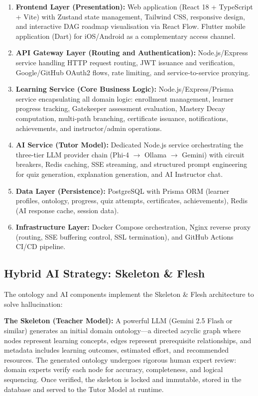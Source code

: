 \begin{enumerate}
    \item \textbf{Frontend Layer (Presentation):} Web application (React 18 + TypeScript + Vite) with Zustand state management, Tailwind CSS, responsive design, and interactive DAG roadmap visualisation via React Flow. Flutter mobile application (Dart) for iOS/Android as a complementary access channel.
    \item \textbf{API Gateway Layer (Routing and Authentication):} Node.js/Express service handling HTTP request routing, JWT issuance and verification, Google/GitHub OAuth2 flows, rate limiting, and service-to-service proxying.
    \item \textbf{Learning Service (Core Business Logic):} Node.js/Express/Prisma service encapsulating all domain logic: enrollment management, learner progress tracking, Gatekeeper assessment evaluation, Mastery Decay computation, multi-path branching, certificate issuance, notifications, achievements, and instructor/admin operations.
    \item \textbf{AI Service (Tutor Model):} Dedicated Node.js service orchestrating the three-tier LLM provider chain (Phi-4 $\to$ Ollama $\to$ Gemini) with circuit breakers, Redis caching, SSE streaming, and structured prompt engineering for quiz generation, explanation generation, and AI Instructor chat.
    \item \textbf{Data Layer (Persistence):} PostgreSQL with Prisma ORM (learner profiles, ontology, progress, quiz attempts, certificates, achievements), Redis (AI response cache, session data).
    \item \textbf{Infrastructure Layer:} Docker Compose orchestration, Nginx reverse proxy (routing, SSE buffering control, SSL termination), and GitHub Actions CI/CD pipeline.
\end{enumerate}

\subsection{Hybrid AI Strategy: Skeleton \& Flesh}

The ontology and AI components implement the Skeleton \& Flesh architecture to solve hallucination:

\textbf{The Skeleton (Teacher Model):} A powerful LLM (Gemini 2.5 Flash or similar) generates an initial domain ontology---a directed acyclic graph where nodes represent learning concepts, edges represent prerequisite relationships, and metadata includes learning outcomes, estimated effort, and recommended resources. The generated ontology undergoes rigorous human expert review: domain experts verify each node for accuracy, completeness, and logical sequencing. Once verified, the skeleton is locked and immutable, stored in the database and served to the Tutor Model at runtime.

